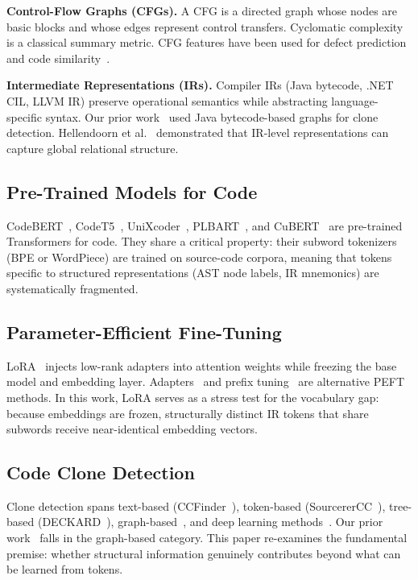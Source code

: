 \documentclass[pdflatex,sn-mathphys,Numbered]{sn-jnl}
\begin{document}
\textbf{Control-Flow Graphs (CFGs).} A CFG is a directed graph whose nodes are basic blocks and whose edges represent control transfers. Cyclomatic complexity~\citep{mccabe1976} is a classical summary metric. CFG features have been used for defect prediction~\citep{wang2016deepdefect} and code similarity~\citep{xu2017neural}.

\textbf{Intermediate Representations (IRs).} Compiler IRs (Java bytecode, .NET CIL, LLVM IR) preserve operational semantics while abstracting language-specific syntax. Our prior work~\citep{yuan2023clone} used Java bytecode-based graphs for clone detection. Hellendoorn et al.~\citep{hellendoorn2020global} demonstrated that IR-level representations can capture global relational structure.

\subsection{Pre-Trained Models for Code}

CodeBERT~\citep{feng2020codebert}, CodeT5~\citep{wang2021codet5}, UniXcoder~\citep{guo2022unixcoder}, PLBART~\citep{ahmad2021plbart}, and CuBERT~\citep{kanade2020pre} are pre-trained Transformers for code. They share a critical property: their subword tokenizers (BPE or WordPiece) are trained on source-code corpora, meaning that tokens specific to structured representations (AST node labels, IR mnemonics) are systematically fragmented.

\subsection{Parameter-Efficient Fine-Tuning}

LoRA~\citep{hu2022lora} injects low-rank adapters into attention weights while freezing the base model and embedding layer. Adapters~\citep{houlsby2019adapter} and prefix tuning~\citep{li2021prefix} are alternative PEFT methods. In this work, LoRA serves as a stress test for the vocabulary gap: because embeddings are frozen, structurally distinct IR tokens that share subwords receive near-identical embedding vectors.

\subsection{Code Clone Detection}

Clone detection spans text-based (CCFinder~\citep{kamiya2002ccfinder}), token-based (SourcererCC~\citep{sajnani2016sourcerercc}), tree-based (DECKARD~\citep{jiang2007deckard}), graph-based~\citep{komondoor2001pdgclone}, and deep learning methods~\citep{white2016deep,wei2019cdlhd,li2017cclearner}. Our prior work~\citep{yuan2023clone} falls in the graph-based category. This paper re-examines the fundamental premise: whether structural information genuinely contributes beyond what can be learned from tokens.
\end{document}
